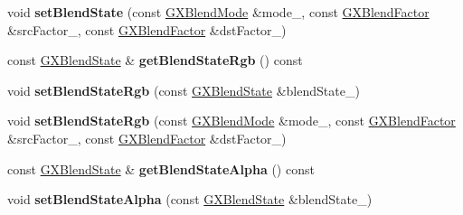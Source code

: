 \begin{DoxyCompactItemize}
\item 
void {\bfseries set\+Blend\+State} (const \hyperlink{class_i_dream_sky_1_1_g_x_blend_mode}{G\+X\+Blend\+Mode} \&mode\+\_\+, const \hyperlink{class_i_dream_sky_1_1_g_x_blend_factor}{G\+X\+Blend\+Factor} \&src\+Factor\+\_\+, const \hyperlink{class_i_dream_sky_1_1_g_x_blend_factor}{G\+X\+Blend\+Factor} \&dst\+Factor\+\_\+)\hypertarget{class_i_dream_sky_1_1_g_x_context_a525c94e3f2c176b86813a15e3b17763f}{}\label{class_i_dream_sky_1_1_g_x_context_a525c94e3f2c176b86813a15e3b17763f}

\item 
const \hyperlink{class_i_dream_sky_1_1_g_x_blend_state}{G\+X\+Blend\+State} \& {\bfseries get\+Blend\+State\+Rgb} () const \hypertarget{class_i_dream_sky_1_1_g_x_context_a76dd7a2065a2616173696b5685cc4a85}{}\label{class_i_dream_sky_1_1_g_x_context_a76dd7a2065a2616173696b5685cc4a85}

\item 
void {\bfseries set\+Blend\+State\+Rgb} (const \hyperlink{class_i_dream_sky_1_1_g_x_blend_state}{G\+X\+Blend\+State} \&blend\+State\+\_\+)\hypertarget{class_i_dream_sky_1_1_g_x_context_a7cdbbc4ae1c993d69c2c9de12cd3156f}{}\label{class_i_dream_sky_1_1_g_x_context_a7cdbbc4ae1c993d69c2c9de12cd3156f}

\item 
void {\bfseries set\+Blend\+State\+Rgb} (const \hyperlink{class_i_dream_sky_1_1_g_x_blend_mode}{G\+X\+Blend\+Mode} \&mode\+\_\+, const \hyperlink{class_i_dream_sky_1_1_g_x_blend_factor}{G\+X\+Blend\+Factor} \&src\+Factor\+\_\+, const \hyperlink{class_i_dream_sky_1_1_g_x_blend_factor}{G\+X\+Blend\+Factor} \&dst\+Factor\+\_\+)\hypertarget{class_i_dream_sky_1_1_g_x_context_a8ab1f4663e2aafe58b78951544530fba}{}\label{class_i_dream_sky_1_1_g_x_context_a8ab1f4663e2aafe58b78951544530fba}

\item 
const \hyperlink{class_i_dream_sky_1_1_g_x_blend_state}{G\+X\+Blend\+State} \& {\bfseries get\+Blend\+State\+Alpha} () const \hypertarget{class_i_dream_sky_1_1_g_x_context_adb72782ef2ea063b754b18cf85470f8e}{}\label{class_i_dream_sky_1_1_g_x_context_adb72782ef2ea063b754b18cf85470f8e}

\item 
void {\bfseries set\+Blend\+State\+Alpha} (const \hyperlink{class_i_dream_sky_1_1_g_x_blend_state}{G\+X\+Blend\+State} \&blend\+State\+\_\+)\hypertarget{class_i_dream_sky_1_1_g_x_context_a41190096effdf7968f52c7fa5786d63f}{}\label{class_i_dream_sky_1_1_g_x_context_a41190096effdf7968f52c7fa5786d63f}


\end{DoxyCompactItemize}
